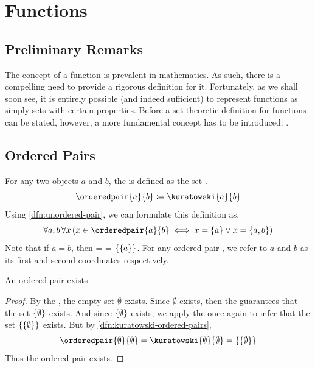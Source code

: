 \chapter{Functions}
\section{Preliminary Remarks}
The concept of a function is prevalent in mathematics. As such, there is a compelling need
to provide a rigorous definition for it. Fortunately, as we shall soon see,
it is entirely possible (and indeed sufficient) to represent functions as simply sets with
certain properties. Before a set-theoretic definition for functions can be stated, however,
a more fundamental concept has to be introduced:
.

\section{Ordered Pairs}

\begin{dfn}
    \label{dfn:kuratowski-ordered-pairs}
    For any two objects \( a \) and \( b \), the  
    is defined as the set .
    \begin{equation*}
        \orderedpair{a}{b} \coloneq \kuratowski{a}{b}
    \end{equation*}
    Using \cref{dfn:unordered-pair}, we can formulate this definition as,
    \begin{equation*}
        \forall a,b \, \forall x \, \mleft( x \in \orderedpair{a}{b}
        \iff
        x = \mleft\{ a \mright\}
        \lor
        x = \mleft\{ a, b \mright\}
        \mright)
    \end{equation*}
    Note that if \( a = b\), then  =  = \( \mleft\{ \mleft\{ a \mright\} \mright\} \).
    For any ordered pair , we refer to \( a \) and \( b \) as its first and second coordinates respectively.
\end{dfn}

\begin{thm}[Existence]
    \label{thm:existence-of-ordered-pair}
    An ordered pair exists.
\end{thm}

\begin{proof}
    By the , the empty set \( \emptyset \) exists. Since \( \emptyset \) exists,
    then the  guarantees that the set \( \mleft\{ \emptyset \mright\} \) exists.
    And since \( \mleft\{ \emptyset \mright\} \) exists, we apply the  once again
    to infer that the set \( \mleft\{ \mleft\{ \emptyset \mright\} \mright\} \) exists. But by \cref{dfn:kuratowski-ordered-pairs},
    \begin{equation*}
        \orderedpair{\emptyset}{\emptyset} = \kuratowski{\emptyset}{\emptyset} = \mleft\{ \mleft\{ \emptyset \mright\} \mright\}
    \end{equation*}
    Thus the ordered pair \orderedpair{\emptyset}{\emptyset} exists.
\end{proof}

